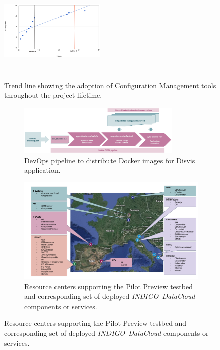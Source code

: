 \documentclass[journal]{IEEEtran}
\begin{document}
\begin{figure}[ht]
\centering
\includegraphics[width=0.45\textwidth, height=50mm]{images/confman.png}
\caption{Trend line showing the adoption of Configuration Management tools throughout the project lifetime.}
\label{fig:fig_confman}
\end{figure}

\begin{figure}	
	\centering
	\begin{subfigure}
		\centering
\includegraphics[width=0.85\textwidth]{images/disvis-flow.png}
\caption{DevOps pipeline to distribute Docker images for Disvis application.}
\label{fig:fig_disvis}		
	\end{subfigure}
	\quad
	\begin{subfigure}
		\centering
\includegraphics[width=\textwidth]{images/pilotpreview.png}
\caption{Resource centers supporting the Pilot Preview testbed and corresponding
set of deployed {\sl INDIGO--DataCloud} components or services.}
\label{fig:fig_pilotpreview}
	\end{subfigure}
\end{figure}
\end{document}
